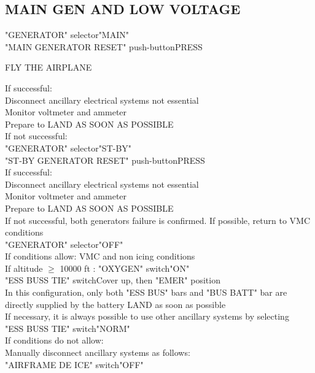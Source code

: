 \documentclass{article}
\newcommand{\fly}{\vspace{-1em}\begin{center}\color{Green}FLY THE AIRPLANE\end{center}\vspace{-1em}}
\begin{document}
\begin{multicols*}{2}
\section*{\color{Orange}MAIN GEN \color{White}AND \color{Orange}LOW VOLTAGE}
"GENERATOR" selector\dotfill "MAIN"\\
"MAIN GENERATOR RESET" push-button\dotfill PRESS\\
\vspace{-1em}\fly
If successful:\\
\hspace*{6mm} Disconnect ancillary electrical systems not essential\\
\hspace*{6mm} Monitor voltmeter and ammeter\\
Prepare to LAND AS SOON AS POSSIBLE\\
If not successful:\\
"GENERATOR" selector\dotfill "ST-BY"\\
"ST-BY GENERATOR RESET" push-button\dotfill PRESS\\
If successful:\\
\hspace*{6mm} Disconnect ancillary electrical systems not essential\\
\hspace*{6mm} Monitor voltmeter and ammeter\\
Prepare to LAND AS SOON AS POSSIBLE\\
If not successful, both generators failure is confirmed. If possible, return to VMC conditions\\
"GENERATOR" selector\dotfill "OFF"\\
If conditions allow: VMC and non icing conditions\\
If altitude $\geq$ 10000 ft : "OXYGEN" switch\dotfill "ON"\\
"ESS BUSS TIE" switch\dotfill Cover up, then "EMER" position\\
In this configuration, only both "ESS BUS" bars and "BUS BATT" bar are directly supplied by the battery
LAND as soon as possible\\
If necessary, it is always possible to use other ancillary systems by selecting\\
"ESS BUSS TIE" switch\dotfill "NORM"\\
If conditions do not allow:\\
Manually disconnect ancillary systems as follows:\\
\hspace*{6mm} "AIRFRAME DE ICE" switch\dotfill "OFF"\\

\end{multicols*}
\end{document}

